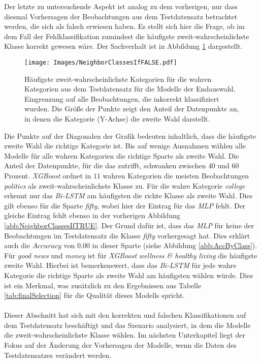 \documentclass[a4paper,11pt]{article}
\begin{document}
Der letzte zu untersuchende Aspekt ist analog zu dem vorherigen, nur dass diesmal Vorhersagen der Beobachtungen aus dem Testdatensatz betrachtet werden, die sich als falsch erwiesen haben. Es stellt sich hier die Frage, ob im dem Fall der Fehlklassifikation zumindest die häufigste zweit-wahrscheinlichste Klasse korrekt gewesen wäre. Der Sachverhalt ist in Abbildung \ref{abb:NeighborClassesIfFALSE} dargestellt.

\begin{figure}[ht]
    \centering
\texttt{[image: Images/NeighborClassesIfFALSE.pdf]} 
\caption{Häufigste zweit-wahrscheinlichste Kategorien für die wahren Kategorien aus dem Testdatensatz für die Modelle der Endauswahl. Eingrenzung auf alle Beobachtungen, die inkorrekt klassifiziert wurden. Die Größe der Punkte zeigt den Anteil der Datenpunkte an, in denen die Kategorie (Y-Achse) die zweite Wahl darstellt.}
\label{abb:NeighborClassesIfFALSE}
\end{figure}

Die Punkte auf der Diagonalen der Grafik bedeuten inhaltlich, dass die häufigste zweite Wahl die richtige Kategorie ist. Bis auf wenige Ausnahmen wählen alle Modelle für alle wahren Kategorien die richtige Sparte als zweite Wahl. Die Anteil der Datenpunkte, für die das zutrifft, schwanken zwischen $40$ und $60$ Prozent. \textit{XGBoost} ordnet in $11$ wahren Kategorien die meisten Beobachtungen \textit{politics} als zweit-wahrscheinlichste Klasse zu. Für die wahre Kategorie \textit{college} erkennt nur das \textit{Bi-LSTM} am häufigsten die richte Klasse als zweite Wahl. Dies gilt ebenso für die Sparte \textit{fifty}, wobei hier der Eintrag für das \textit{MLP} fehlt. Der gleiche Eintrag fehlt ebenso in der vorherigen Abbildung \ref{abb:NeighborClassesIfTRUE}. Der Grund dafür ist, dass das \textit{MLP} für keine der Beobachtungen im Testdatensatz die Klasse \textit{fifty} vorhergesagt hat. Dies erklärt auch die $Accuracy$ von $0.00$ in dieser Sparte (siehe Abbildung \ref{abb:AccByClass}). Für \textit{good news} und \textit{money} ist für \textit{XGBoost} \textit{wellness \& healthy living} die häufigste zweite Wahl. Hierbei ist bemerkenswert, dass das \textit{Bi-LSTM} für jede wahre Kategorie die richtige Sparte als zweite Wahl am häufigsten wählen würde. Dies ist ein Merkmal, was zusätzlich zu den Ergebnissen aus Tabelle \ref{tab:finalSelection} für die Qualität dieses Modells spricht.\\
\\
Dieser Abschnitt hat sich mit den korrekten und falschen Klassifikationen auf dem Testdatensatz beschäftigt und das Szenario analysiert, in dem die Modelle die zweit-wahrscheinlichste Klasse wählen. Im nächsten Unterkapitel liegt der Fokus auf der Änderung der Vorhersagen der Modelle, wenn die Daten des Testdatensatzes verändert werden.
\end{document}

